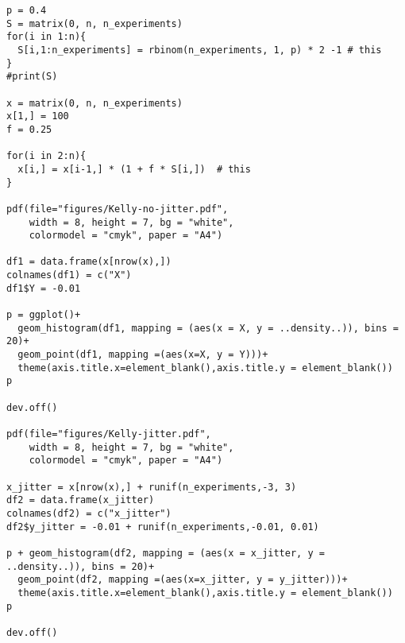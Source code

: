 \begin{exercise}
\begin{verbatim}
p = 0.4
S = matrix(0, n, n_experiments)
for(i in 1:n){
  S[i,1:n_experiments] = rbinom(n_experiments, 1, p) * 2 -1 # this
}
#print(S)

x = matrix(0, n, n_experiments)
x[1,] = 100
f = 0.25

for(i in 2:n){
  x[i,] = x[i-1,] * (1 + f * S[i,])  # this
}

pdf(file="figures/Kelly-no-jitter.pdf",
    width = 8, height = 7, bg = "white",          
    colormodel = "cmyk", paper = "A4")

df1 = data.frame(x[nrow(x),])
colnames(df1) = c("X")
df1$Y = -0.01

p = ggplot()+
  geom_histogram(df1, mapping = (aes(x = X, y = ..density..)), bins = 20)+
  geom_point(df1, mapping =(aes(x=X, y = Y)))+
  theme(axis.title.x=element_blank(),axis.title.y = element_blank())
p 

dev.off()

pdf(file="figures/Kelly-jitter.pdf",
    width = 8, height = 7, bg = "white",          
    colormodel = "cmyk", paper = "A4")

x_jitter = x[nrow(x),] + runif(n_experiments,-3, 3)
df2 = data.frame(x_jitter)
colnames(df2) = c("x_jitter")
df2$y_jitter = -0.01 + runif(n_experiments,-0.01, 0.01)

p + geom_histogram(df2, mapping = (aes(x = x_jitter, y = ..density..)), bins = 20)+
  geom_point(df2, mapping =(aes(x=x_jitter, y = y_jitter)))+
  theme(axis.title.x=element_blank(),axis.title.y = element_blank())
p

dev.off()
\end{verbatim}


\end{exercise}



